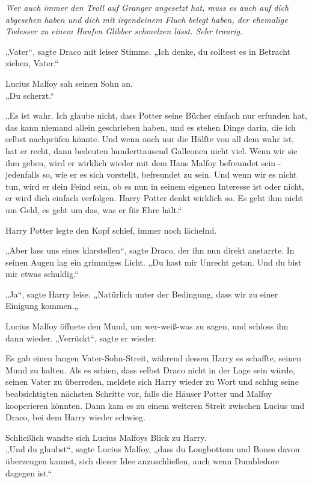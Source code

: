 {\emph{Wer auch immer den Troll auf Granger angesetzt hat, muss es auch auf dich abgesehen haben und dich mit irgendeinem Fluch belegt haben, der ehemalige Todesser zu einem Haufen Glibber schmelzen lässt. Sehr traurig.}

„Vater“, sagte Draco mit leiser Stimme. „Ich denke, du solltest es in Betracht ziehen, Vater.“

Lucius Malfoy sah seinen Sohn an.\\ „Du scherzt.“

„Es ist wahr. Ich glaube nicht, dass Potter seine Bücher einfach nur erfunden hat, das kann niemand allein geschrieben haben, und es stehen Dinge darin, die ich selbst nachprüfen könnte. Und wenn auch nur die Hälfte von all dem wahr ist, hat er recht, dann bedeuten hunderttausend Galleonen nicht viel. Wenn wir sie ihm geben, wird er wirklich wieder mit dem Haus Malfoy befreundet sein - jedenfalls so, wie er es sich vorstellt, befreundet zu sein. Und wenn wir es nicht tun, wird er dein Feind sein, ob es nun in seinem eigenen Interesse ist oder nicht, er wird dich einfach verfolgen. Harry Potter denkt wirklich so. Es geht ihm nicht um Geld, es geht um das, was er für Ehre hält.“

Harry Potter legte den Kopf schief, immer noch lächelnd.

„Aber lass uns eines klarstellen“, sagte Draco, der ihn nun direkt anstarrte. In seinen Augen lag ein grimmiges Licht. „Du hast mir Unrecht getan. Und du bist mir etwas schuldig.“

„Ja“, sagte Harry leise. „Natürlich unter der Bedingung, dass wir zu einer Einigung kommen.„

Lucius Malfoy öffnete den Mund, um wer-weiß-was zu sagen, und schloss ihn dann wieder. „Verrückt“, sagte er wieder.

Es gab einen langen Vater-Sohn-Streit, während dessen Harry es schaffte, seinen Mund zu halten. Als es schien, dass selbst Draco nicht in der Lage sein würde, seinen Vater zu überreden, meldete sich Harry wieder zu Wort und schlug seine beabsichtigten nächsten Schritte vor, falls die Häuser Potter und Malfoy kooperieren könnten. Dann kam es zu einem weiteren Streit zwischen Lucius und Draco, bei dem Harry wieder schwieg.

Schließlich wandte sich Lucius Malfoys Blick zu Harry.\\ „Und du glaubst“, sagte Lucius Malfoy, „dass du Longbottom und Bones davon überzeugen kannst, sich dieser Idee anzuschließen, auch wenn Dumbledore dagegen ist.“

}
